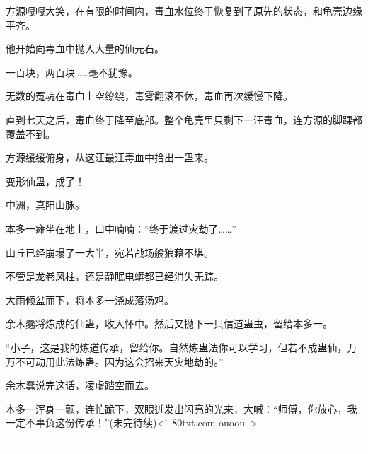 \begin{this_body}
方源嘎嘎大笑，在有限的时间内，毒血水位终于恢复到了原先的状态，和龟壳边缘平齐。

他开始向毒血中抛入大量的仙元石。

一百块，两百块……毫不犹豫。

无数的冤魂在毒血上空缭绕，毒雾翻滚不休，毒血再次缓慢下降。

直到七天之后，毒血终于降至底部。整个龟壳里只剩下一汪毒血，连方源的脚踝都覆盖不到。

方源缓缓俯身，从这汪最汪毒血中拾出一蛊来。

变形仙蛊，成了！

中洲，真阳山脉。

本多一瘫坐在地上，口中喃喃：“终于渡过灾劫了……”

山丘已经崩塌了一大半，宛若战场般狼藉不堪。

不管是龙卷风柱，还是静眠电蟒都已经消失无踪。

大雨倾盆而下，将本多一浇成落汤鸡。

余木蠢将炼成的仙蛊，收入怀中。然后又抛下一只信道蛊虫，留给本多一。

“小子，这是我的炼道传承，留给你。自然炼蛊法你可以学习，但若不成蛊仙，万万不可动用此法炼蛊。因为这会招来天灾地劫的。”

余木蠢说完这话，凌虚踏空而去。

本多一浑身一颤，连忙跪下，双眼迸发出闪亮的光来，大喊：“师傅，你放心，我一定不辜负这份传承！”(未完待续)<!--80txt.com-ouoou-->

------------

\end{this_body}

